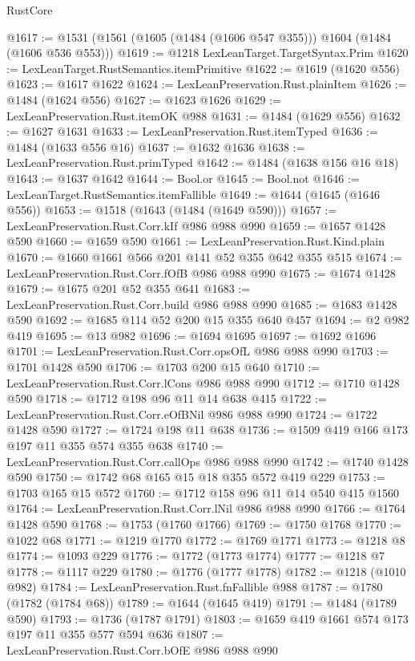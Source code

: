 \begin{lexlean}{RustCore}
\begin{coremodule}
@1617 := @1531 (@1561 (@1605 (@1484 (@1606 @547 @355))) @1604 (@1484 (@1606 @536 @553)))
@1619 := @1218 LexLeanTarget.TargetSyntax.Prim
@1620 := LexLeanTarget.RustSemantics.itemPrimitive
@1622 := @1619 (@1620 @556)
@1623 := @1617 @1622
@1624 := LexLeanPreservation.Rust.plainItem
@1626 := @1484 (@1624 @556)
@1627 := @1623 @1626
@1629 := LexLeanPreservation.Rust.itemOK @988
@1631 := @1484 (@1629 @556)
@1632 := @1627 @1631
@1633 := LexLeanPreservation.Rust.itemTyped
@1636 := @1484 (@1633 @556 @16)
@1637 := @1632 @1636
@1638 := LexLeanPreservation.Rust.primTyped
@1642 := @1484 (@1638 @156 @16 @18)
@1643 := @1637 @1642
@1644 := Bool.or
@1645 := Bool.not
@1646 := LexLeanTarget.RustSemantics.itemFallible
@1649 := @1644 (@1645 (@1646 @556))
@1653 := @1518 (@1643 (@1484 (@1649 @590)))
@1657 := LexLeanPreservation.Rust.Corr.kIf @986 @988 @990
@1659 := @1657 @1428 @590
@1660 := @1659 @590
@1661 := LexLeanPreservation.Rust.Kind.plain
@1670 := @1660 @1661 @566 @201 @141 @52 @355 @642 @355 @515
@1674 := LexLeanPreservation.Rust.Corr.fOfB @986 @988 @990
@1675 := @1674 @1428
@1679 := @1675 @201 @52 @355 @641
@1683 := LexLeanPreservation.Rust.Corr.build @986 @988 @990
@1685 := @1683 @1428 @590
@1692 := @1685 @114 @52 @200 @15 @355 @640 @457
@1694 := @2 @982 @419
@1695 := @13 @982
@1696 := @1694 @1695
@1697 := @1692 @1696
@1701 := LexLeanPreservation.Rust.Corr.opsOfL @986 @988 @990
@1703 := @1701 @1428 @590
@1706 := @1703 @200 @15 @640
@1710 := LexLeanPreservation.Rust.Corr.lCons @986 @988 @990
@1712 := @1710 @1428 @590
@1718 := @1712 @198 @96 @11 @14 @638 @415
@1722 := LexLeanPreservation.Rust.Corr.eOfBNil @986 @988 @990
@1724 := @1722 @1428 @590
@1727 := @1724 @198 @11 @638
@1736 := @1509 @419 @166 @173 @197 @11 @355 @574 @355 @638
@1740 := LexLeanPreservation.Rust.Corr.callOps @986 @988 @990
@1742 := @1740 @1428 @590
@1750 := @1742 @68 @165 @15 @18 @355 @572 @419 @229
@1753 := @1703 @165 @15 @572
@1760 := @1712 @158 @96 @11 @14 @540 @415 @1560
@1764 := LexLeanPreservation.Rust.Corr.lNil @986 @988 @990
@1766 := @1764 @1428 @590
@1768 := @1753 (@1760 @1766)
@1769 := @1750 @1768
@1770 := @1022 @68
@1771 := @1219 @1770
@1772 := @1769 @1771
@1773 := @1218 @8
@1774 := @1093 @229
@1776 := @1772 (@1773 @1774)
@1777 := @1218 @7
@1778 := @1117 @229
@1780 := @1776 (@1777 @1778)
@1782 := @1218 (@1010 @982)
@1784 := LexLeanPreservation.Rust.fnFallible @988
@1787 := @1780 (@1782 (@1784 @68))
@1789 := @1644 (@1645 @419)
@1791 := @1484 (@1789 @590)
@1793 := @1736 (@1787 @1791)
@1803 := @1659 @419 @1661 @574 @173 @197 @11 @355 @577 @594 @636
@1807 := LexLeanPreservation.Rust.Corr.bOfE @986 @988 @990

\end{coremodule}
\end{lexlean}
